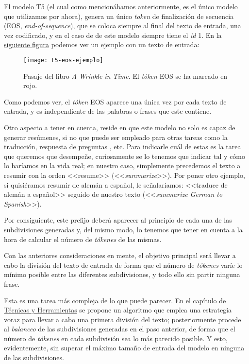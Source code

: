 El modelo T5 (el cual como mencionábamos anteriormente, es el único modelo que utilizamos por ahora), genera un único \emph{token} de finalización de secuencia (EOS, \emph{end-of-sequence}), que se coloca siempre al final del texto de entrada, una vez codificado, y en el caso de de este modelo siempre tiene el \emph{id} 1. En la \hyperref[fig:t5-eos-ejemplo]{siguiente figura} podemos ver un ejemplo con un texto de entrada:

\begin{figure}[h]
	\centering
	\texttt{[image: t5-eos-ejemplo]}
	\caption{Pasaje del libro \emph{A Wrinkle in Time}. El \emph{tóken} EOS se ha marcado en rojo.}
	\label{fig:t5-eos-ejemplo}
\end{figure}

Como podemos ver, el \emph{tóken} EOS aparece una única vez por cada texto de entrada, y es independiente de las palabras o frases que este contiene.

Otro aspecto a tener en cuenta, reside en que este modelo no solo es capaz de generar resúmenes, si no que puede ser empleado para otras tareas como la traducción, respuesta de preguntas \cite{raffel19}, etc. Para indicarle cuál de estas es la tarea que queremos que desempeñe, curiosamente se lo tenemos que indicar tal y cómo lo haríamos en la vida real; en nuestro caso, simplemente precedemos el texto a resumir con la orden <<resume>> (<<\emph{summarize}>>). Por poner otro ejemplo, si quisiéramos resumir de alemán a español, le señalaríamos: <<traduce de alemán a español>> seguido de nuestro texto (<<\emph{summarize German to Spanish}>>).

Por consiguiente, este prefijo deberá aparecer al principio de cada una de las subdivisiones generadas y, del mismo modo, lo tenemos que tener en cuenta a la hora de calcular el número de \emph{tókenes} de las mismas.

Con las anteriores consideraciones en mente, el objetivo principal será llevar a cabo la división del texto de entrada de forma que el número de \emph{tókenes} varíe lo mínimo posible entre las diferentes subdivisiones, y todo ello sin partir ninguna frase.

Esta es una tarea más compleja de lo que puede parecer. En el capítulo de \hyperref[chapter:tecnicas]{Técnicas y Herramientas} se propone un algoritmo que emplea una estrategia voraz para llevar a cabo una primera división del texto; posteriormente procede al \emph{balanceo} de las subdivisiones generadas en el paso anterior, de forma que el número de \emph{tókenes} en cada subdivisión sea lo más parecido posible. Y esto, evidentemente, sin superar el máximo tamaño de entrada del modelo en ninguna de las subdivisiones.



